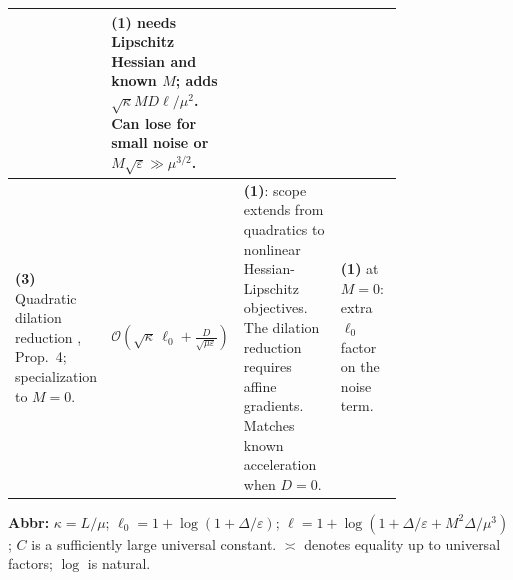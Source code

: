 \begin{table}[tp]
\begin{threeparttable}
\begin{tabularx}{\linewidth}{@{}>{\raggedright\arraybackslash}p{0.20\linewidth}>{\raggedright\arraybackslash}p{0.32\linewidth}>{\raggedright\arraybackslash}p{0.25\linewidth}>{\raggedright\arraybackslash}X@{}}
& \textbf{(1)} needs Lipschitz Hessian and known $M$; adds $\sqrt{\kappa}MD\ell/\mu^2$. Can lose for small noise or $M\sqrt{\varepsilon}\gg\mu^{3/2}$. \\
\midrule
\textbf{(3)} Quadratic dilation reduction \citep{hltSchmidt2011v2}, Prop.~4; specialization to $M=0$.
& $\displaystyle\mathcal{O}\!\left(\sqrt{\kappa}\,\ell_0+\frac{D}{\sqrt{\mu\varepsilon}}\right)$
& \textbf{(1)}: scope extends from quadratics to nonlinear Hessian-Lipschitz objectives. The dilation reduction requires affine gradients. Matches known acceleration when $D=0$.
& \textbf{(1)} at $M=0$: extra $\ell_0$ factor on the noise term. \\
\bottomrule
\end{tabularx}
\begin{tablenotes}[flushleft]\footnotesize
\item[] \textbf{Abbr:} $\kappa=L/\mu$; $\ell_0=1+\log(1+\Delta/\varepsilon)$; $\ell=1+\log(1+\Delta/\varepsilon+M^2\Delta/\mu^3)$; $C$ is a sufficiently large universal constant. $\asymp$ denotes equality up to universal factors; $\log$ is natural.
\end{tablenotes}
\end{threeparttable}
\end{table}
\clearpage
